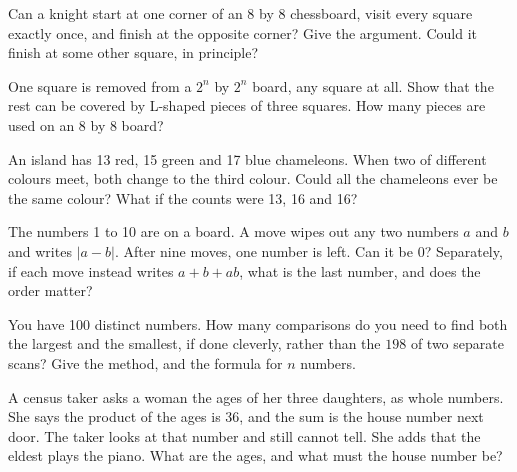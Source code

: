 \begin{question}\label{iq:iv1:logic-riddles:17}
Can a knight start at one corner of an 8 by 8 chessboard, visit every square exactly once, and finish at the opposite corner? Give the argument. Could it finish at some other square, in principle?
\end{question}

\begin{question}\label{iq:iv1:logic-riddles:18}
One square is removed from a $2^n$ by $2^n$ board, any square at all. Show that the rest can be covered by L-shaped pieces of three squares. How many pieces are used on an 8 by 8 board?
\end{question}

\begin{question}\label{iq:iv1:logic-riddles:19}
An island has 13 red, 15 green and 17 blue chameleons. When two of different colours meet, both change to the third colour. Could all the chameleons ever be the same colour? What if the counts were 13, 16 and 16?
\end{question}

\begin{question}\label{iq:iv1:logic-riddles:20}
The numbers 1 to 10 are on a board. A move wipes out any two numbers $a$ and $b$ and writes $|a - b|$. After nine moves, one number is left. Can it be 0? Separately, if each move instead writes $a + b + ab$, what is the last number, and does the order matter?
\end{question}

\begin{question}\label{iq:iv1:logic-riddles:21}
You have 100 distinct numbers. How many comparisons do you need to find both the largest and the smallest, if done cleverly, rather than the $198$ of two separate scans? Give the method, and the formula for $n$ numbers.
\end{question}

\begin{question}\label{iq:iv1:logic-riddles:22}
A census taker asks a woman the ages of her three daughters, as whole numbers. She says the product of the ages is 36, and the sum is the house number next door. The taker looks at that number and still cannot tell. She adds that the eldest plays the piano. What are the ages, and what must the house number be?
\end{question}

